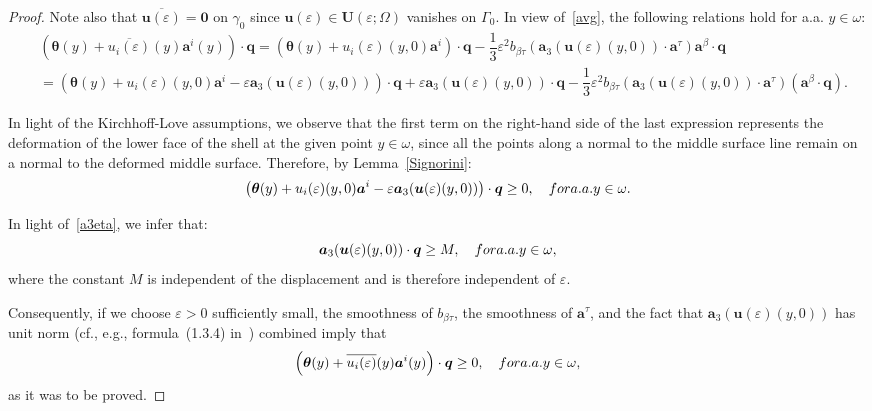 \documentclass{amsart}
\begin{document}
\begin{proof}
	Note also that $\overline{\bm{u}(\varepsilon)}=\bm{0}$ on $\gamma_0$ since $\bm{u}(\varepsilon)\in\bm{U}(\varepsilon;\Omega)$ vanishes on $\Gamma_0$.
	In view of~\eqref{avg}, the following relations hold for a.a. $y\in\omega$:
	\begin{equation*}
		\begin{aligned}
			&\left(\bm{\theta}(y)+\overline{u_i(\varepsilon)}(y)\bm{a}^i(y)\right)\cdot\bm{q}=\left(\bm{\theta}(y)+u_i(\varepsilon)(y,0)\bm{a}^i\right)\cdot\bm{q}-\dfrac{1}{3}\varepsilon^2 b_{\beta\tau}(\bm{a}_3(\bm{u}(\varepsilon)(y,0)) \cdot\bm{a}^\tau) \bm{a}^\beta\cdot\bm{q}\\
			&=\left(\bm{\theta}(y)+u_i(\varepsilon)(y,0)\bm{a}^i-\varepsilon\bm{a}_3(\bm{u}(\varepsilon)(y,0))\right)\cdot\bm{q}+\varepsilon\bm{a}_3(\bm{u}(\varepsilon)(y,0))\cdot\bm{q}-\dfrac{1}{3}\varepsilon^2 b_{\beta\tau}(\bm{a}_3(\bm{u}(\varepsilon)(y,0)) \cdot\bm{a}^\tau) (\bm{a}^\beta\cdot\bm{q}).
		\end{aligned}
	\end{equation*}
	
	In light of the Kirchhoff-Love assumptions, we observe that the first term on the right-hand side of the last expression represents the deformation of the lower face of the shell at the given point $y \in \omega$, since all the points along a normal to the middle surface line remain on a normal to the deformed middle surface. Therefore, by Lemma~\ref{Signorini}:
	\begin{equation*}
		\left(\bm{\theta}(y)+u_i(\varepsilon)(y,0)\bm{a}^i-\varepsilon\bm{a}_3(\bm{u}(\varepsilon)(y,0))\right)\cdot\bm{q}\ge 0,\quad\textup{ for a.a. }y\in\omega.
	\end{equation*}
	
	In light of~\eqref{a3eta}, we infer that:
	\begin{equation*}
		\bm{a}_3(\bm{u}(\varepsilon)(y,0))\cdot\bm{q} \ge M, \quad\textup{ for a.a. }y\in\omega,
	\end{equation*}
	where the constant $M$ is independent of the displacement and is therefore independent of $\varepsilon$.
	
	Consequently, if we choose $\varepsilon>0$ sufficiently small, the smoothness of $b_{\beta\tau}$, the smoothness of $\bm{a}^\tau$, and the fact that $\bm{a}_3(\bm{u}(\varepsilon)(y,0))$ has unit norm (cf., e.g., formula~(1.3.4) in~\cite{BerBoi1982}) combined imply that
	\begin{equation*}
		\left(\bm{\theta}(y)+\overline{u_i(\varepsilon)}(y)\bm{a}^i(y)\right)\cdot\bm{q}\ge 0, \quad\textup{ for a.a. }y\in\omega,
	\end{equation*}
	as it was to be proved.
\end{proof}
\end{document}
